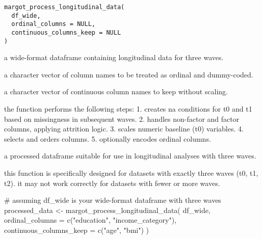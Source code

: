 \documentclass[a4paper]{book}
\begin{document}
%
\begin{Usage}
\begin{verbatim}
margot_process_longitudinal_data(
  df_wide,
  ordinal_columns = NULL,
  continuous_columns_keep = NULL
)
\end{verbatim}
\end{Usage}
%
\begin{Arguments}
\begin{ldescription}
\item[\code{df\_wide}] a wide-format dataframe containing longitudinal data for three waves.

\item[\code{ordinal\_columns}] a character vector of column names to be treated as ordinal and dummy-coded.

\item[\code{continuous\_columns\_keep}] a character vector of continuous column names to keep without scaling.
\end{ldescription}
\end{Arguments}
%
\begin{Details}
the function performs the following steps:
1. creates na conditions for t0 and t1 based on missingness in subsequent waves.
2. handles non-factor and factor columns, applying attrition logic.
3. scales numeric baseline (t0) variables.
4. selects and orders columns.
5. optionally encodes ordinal columns.
\end{Details}
%
\begin{Value}
a processed dataframe suitable for use in longitudinal analyses with three waves.
\end{Value}
%
\begin{Note}
this function is specifically designed for datasets with exactly three waves (t0, t1, t2).
it may not work correctly for datasets with fewer or more waves.
\end{Note}
%
\begin{Examples}
\begin{ExampleCode}
# assuming df_wide is your wide-format dataframe with three waves
processed_data <- margot_process_longitudinal_data(
  df_wide,
  ordinal_columns = c("education", "income_category"),
  continuous_columns_keep = c("age", "bmi")
)
\end{ExampleCode}
\end{Examples}
\end{document}
